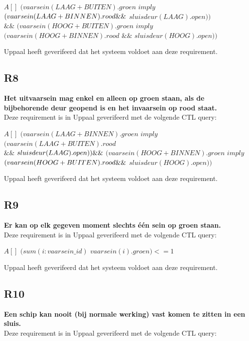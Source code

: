 \documentclass{article} %
\begin{document}
\begin{boxA}
    $A[]$ $(vaarsein(LAAG + BUITEN).groen$ $imply$ $(vaarsein(LAAG + BINNEN).rood \\ \&\& $ $sluisdeur(LAAG).open))$ \\ $\&\& $ $(vaarsein(HOOG + BUITEN).groen$ $imply$ $(vaarsein(HOOG + BINNEN).rood$ $\&\& $ $sluisdeur(HOOG).open))$
\end{boxA}

Uppaal heeft geverifeerd dat het systeem voldoet aan deze requirement.

\subsection{R8}
\textbf{Het uitvaarsein mag enkel en alleen op groen staan, als de bijbehorende deur geopend is en het invaarsein op rood staat.} \\
Deze requirement is in Uppaal geverifeerd met de volgende CTL query:
\begin{boxA}
    $A[]$ $(vaarsein(LAAG + BINNEN).groen$ $imply$ $(vaarsein(LAAG + BUITEN).rood$ \\ $ \&\&$ $sluisdeur(LAAG).open)) \\ \&\& $ $(vaarsein(HOOG + BINNEN).groen$ $imply$ $(vaarsein(HOOG + BUITEN).rood \\ \&\&$ $sluisdeur(HOOG).open))$
\end{boxA}
Uppaal heeft geverifeerd dat het systeem voldoet aan deze requirement.
\newpage

\subsection{R9}
\textbf{Er kan op elk gegeven moment slechts één sein op groen staan.} \\
Deze requirement is in Uppaal geverifeerd met de volgende CTL query:

\begin{boxA}
    $A[]$ $(sum (i : vaarsein\_id)$ $vaarsein(i).groen) <= 1$
\end{boxA}

Uppaal heeft geverifeerd dat het systeem voldoet aan deze requirement.

\subsection{R10}
\textbf{Een schip kan nooit (bij normale werking) vast komen te zitten in een sluis.} \\
Deze requirement is in Uppaal geverifeerd met de volgende CTL query:
\end{document}
